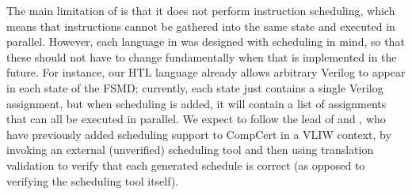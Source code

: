 The main limitation of \vericert{} is that it does not perform instruction scheduling, which means that instructions cannot be gathered into the same state and executed in parallel.
However, each language in \vericert{} was designed with scheduling in mind, so
that these should not have to change fundamentally when that is implemented in
the future.  For instance, our HTL language already allows arbitrary Verilog to
appear in each state of the FSMD; currently, each state just contains a single
Verilog assignment, but when scheduling is added, it will contain a list of
assignments that can all be executed in parallel. We expect to follow the lead
of \textcite{tristan08_formal_verif_trans_valid} and
\textcite{six20_certif_effic_instr_sched}, who have previously added scheduling
support to CompCert in a VLIW context, by invoking an external (unverified)
scheduling tool and then using translation validation to verify that each
generated schedule is correct (as opposed to verifying the scheduling tool
itself).


